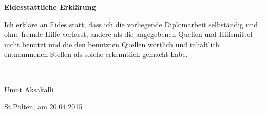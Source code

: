 \begin{flushleft}
\Large
\textbf{Eidesstattliche Erklärung\\}
\vspace{1.5cm}
\end{flushleft}


Ich erkläre an Eides statt, dass ich die vorliegende Diplomarbeit selbständig und ohne fremde Hilfe verfasst, andere als die angegebenen Quellen
und Hilfsmittel nicht benutzt und die den benutzten Quellen wörtlich und inhaltlich entnommenen Stellen als solche erkenntlich gemacht habe.

\begin{center}
	\vspace{1.5cm}
	\rule{200pt}{1pt} \\
	Umut Aksakalli
	
\end{center}

St.Pölten, am 20.04.2015
	
	
